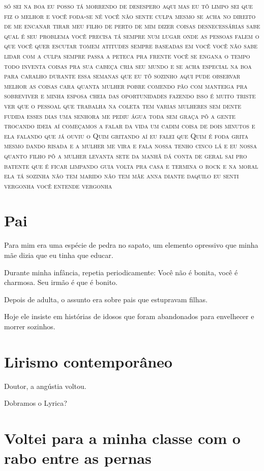 \textsc{só sei na boa eu posso tá morrendo de desespero aqui mas eu tô
limpo sei que fiz o melhor e você foda-se né você não sente culpa
mesmo se acha no direito de me encanar tirar meu filho de perto de mim
dizer coisas desnecessárias sabe qual é seu problema você precisa tá
sempre num lugar onde as pessoas falem o que você quer escutar tomem
atitudes sempre baseadas em você você não sabe lidar com a culpa sempre
passa a peteca pra frente você se engana o tempo todo inventa coisas pra
sua cabeça cria seu mundo e se acha especial na boa para caralho durante
essa semanas que eu tô sozinho aqui pude observar melhor as coisas cara
quanta mulher pobre comendo pão com manteiga pra sobreviver e minha
esposa cheia das oportunidades fazendo isso é muito triste ver que o
pessoal que trabalha na coleta tem varias mulheres sem dente fudida
esses dias uma senhora me pediu água toda sem graça pô a gente trocando
ideia aí começamos a falar da vida um cadim coisa de dois minutos e ela
falando que já ouviu o Quim gritando aí eu falei que Quim é foda grita
mesmo dando risada e a mulher me vira e fala nossa tenho cinco lá e eu
nossa quanto filho pô a mulher levanta sete da manhã dá conta de geral
sai pro batente que é ficar limpando guia volta pra casa e termina o
rock e na moral ela tá sozinha não tem marido não tem mãe anna diante
daquilo eu senti vergonha você entende vergonha }

\chapter{Pai}

Para mim era uma espécie de pedra no sapato, um elemento opressivo que
minha mãe dizia que eu tinha que educar.

Durante minha infância, repetia periodicamente: Você não é bonita, você
é charmosa. Seu irmão é que é bonito.

Depois de adulta, o assunto era sobre pais que estupravam filhas.

Hoje ele insiste em histórias de idosos que foram abandonados para
envelhecer e morrer sozinhos.


\chapter{Lirismo contemporâneo}\label{lirismo-contemporuxe2neo}

{\noindent
Doutor, a angústia voltou.

Dobramos o Lyrica?}

\chapter{Voltei para a minha classe com o rabo entre as pernas}

